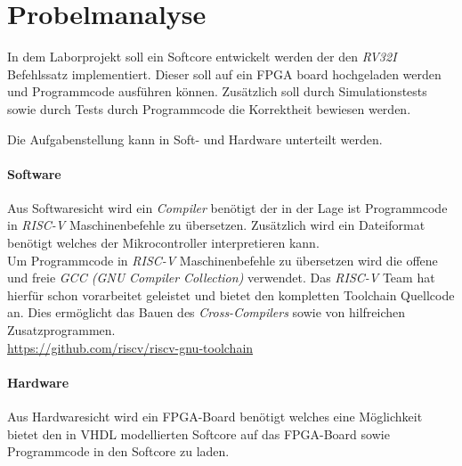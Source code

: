 \chapter{Probelmanalyse}



    In dem Laborprojekt soll ein Softcore entwickelt werden der den \textit{RV32I} Befehlssatz implementiert.
    Dieser soll auf ein FPGA board hochgeladen werden und Programmcode ausführen können.
    Zusätzlich soll durch Simulationstests sowie durch Tests durch Programmcode die Korrektheit
    bewiesen werden.

    Die Aufgabenstellung kann in Soft- und Hardware unterteilt werden.

        \subsubsection{Software}
            Aus Softwaresicht wird ein \textit{Compiler} benötigt der in der Lage ist Programmcode
            in \textit{RISC-V} Maschinenbefehle zu übersetzen. Zusätzlich wird ein Dateiformat benötigt
            welches der Mikrocontroller interpretieren kann.
            \\
            Um Programmcode in \textit{RISC-V} Maschinenbefehle zu übersetzen wird die 
            offene und freie \textit{GCC (GNU Compiler Collection)} verwendet.
            Das \textit{RISC-V} Team hat hierfür schon vorarbeitet geleistet und bietet
            den kompletten Toolchain Quellcode an.
            Dies ermöglicht das Bauen des \textit{Cross-Compilers} sowie von hilfreichen Zusatzprogrammen.
            \\
            \url{https://github.com/riscv/riscv-gnu-toolchain}

        \subsubsection{Hardware}
            Aus Hardwaresicht wird ein FPGA-Board benötigt welches eine Möglichkeit bietet
            den in VHDL modellierten Softcore auf das FPGA-Board sowie Programmcode
            in den Softcore zu laden.




